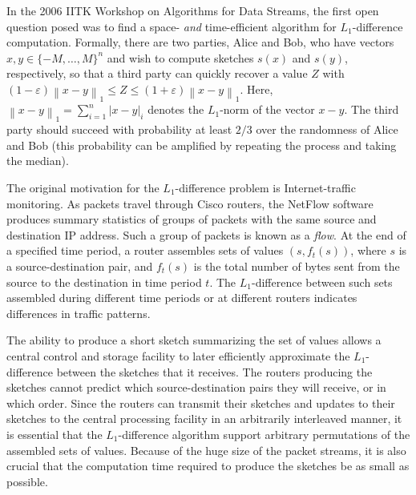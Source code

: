 \documentclass[letterpaper,11pt]{article}
\newcommand{\eps}{\varepsilon}
\newcommand{\norm}[1]{\left\lVert #1 \right\rVert}
\begin{document}
In the 2006 IITK Workshop on Algorithms for Data Streams, the first
open question posed \cite{IITK} was to find a space- {\it and}
time-efficient algorithm for $L_1$-difference computation. Formally,
there are two parties, Alice and Bob, who have vectors $x, y \in \{-M,
\ldots, M\}^n$ and wish to compute sketches $s(x)$
and $s(y)$, respectively, so that a third party can quickly recover a
value $Z$ with $(1-\eps)\norm{x-y}_1 \leq Z \leq
(1+\eps)\norm{x-y}_1$. Here, $\norm{x-y}_1 = \sum_{i=1}^n |x-y|_i$
denotes the $L_1$-norm of the vector $x-y$. The third party should
succeed with probability at least $2/3$ over the randomness of Alice
and Bob (this probability can be amplified by
repeating the process and taking the median).

The original motivation \cite{FKSV02} for the $L_1$-difference problem is
Internet-traffic monitoring. As packets travel through
Cisco routers, the NetFlow software \cite{CN98} produces summary
statistics of groups of packets with the same source and destination
IP address. Such a group of packets is known as a {\it flow}. At the
end of a specified time period, a router assembles sets of values $(s,
f_t(s))$, where $s$ is a source-destination pair, and $f_t(s)$ is the
total number of bytes sent from the source to the destination in time
period $t$. The $L_1$-difference between such sets assembled during
different time periods or at different routers indicates differences
in traffic patterns.

The ability to produce a short sketch summarizing the set of values
allows a central control and storage facility to later efficiently
approximate the $L_1$-difference between the sketches that it
receives. The routers producing the sketches cannot
predict which source-destination pairs they will receive, or in which
order. Since the routers can transmit their sketches and updates
to their sketches to the central processing facility in an arbitrarily
interleaved manner, it is essential that the $L_1$-difference
algorithm support arbitrary permutations of the assembled sets of
values. Because of the huge size of the packet streams, it is also
crucial that the computation time required to produce the sketches
be as small as possible.
\end{document}
